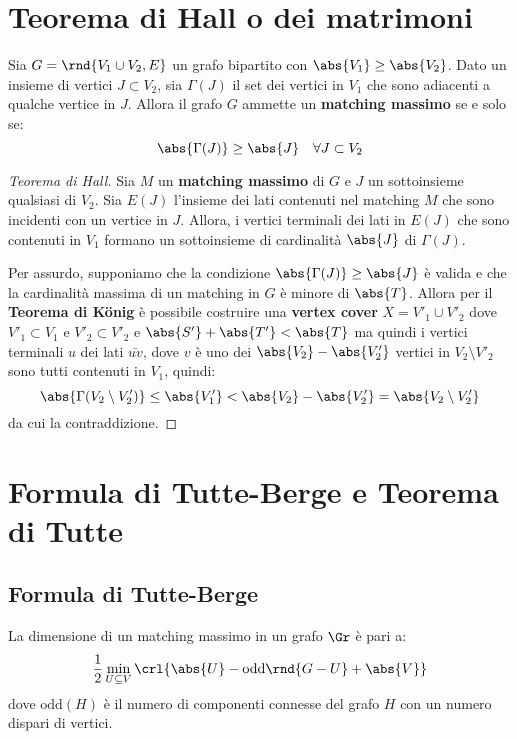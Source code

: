 \documentclass[\main/main.tex]{subfiles}
\begin{document}
\section{Teorema di Hall o dei matrimoni}
\begin{theorem}
  Sia \(G = \rnd{V_1 \cup V_2, E}\) un grafo bipartito con \(\abs{V_1} \geq \abs{V_2}\). Dato un insieme di vertici \(J \subset V_2\), sia \(\Gamma(J) \) il set dei vertici in \(V_1\) che sono adiacenti a qualche vertice in \(J\). Allora il grafo \(G\) ammette un \textbf{matching massimo} se e solo se:
  \[
    \abs{\Gamma(J)} \geq \abs{J} \quad \forall J \subset V_2
  \]
\end{theorem}

\begin{proof}[Teorema di Hall]
  Sia \(M\) un \textbf{matching massimo} di \(G\) e \(J\) un sottoinsieme qualsiasi di \(V_2\). Sia \(E(J)\) l'insieme dei lati contenuti nel matching \(M\) che sono incidenti con un vertice in \(J\). Allora, i vertici terminali dei lati in \(E(J)\) che sono contenuti in \(V_1\) formano un sottoinsieme di cardinalità \(\abs{J}\) di \(\Gamma(J)\).

  Per assurdo, supponiamo che la condizione \(\abs{\Gamma(J)} \geq \abs{J}\) è valida e che la cardinalità massima di un matching in \(G\) è minore di \(\abs{T}\). Allora per il \textbf{Teorema di König} è possibile costruire una \textbf{vertex cover} \(X=V'_1 \cup V'_2\) dove \(V'_1 \subset V_1\) e \(V'_2 \subset V'_2\) e \(\abs{S'} + \abs{T'} < \abs{T}\) ma quindi i vertici terminali \(u\) dei lati \(\bar{uv}\), dove \(v\) è uno dei \(\abs{V_2} - \abs{V'_2}\) vertici in \(V_2\setminus V'_2\) sono tutti contenuti in \(V_1\), quindi:
  \[
    \abs{\Gamma(V_2\setminus V'_2)} \leq \abs{V'_1} < \abs{V_2} - \abs{V'_2} = \abs{V_2\setminus V'_2}
  \]
  da cui la contraddizione.
\end{proof}

\section{Formula di Tutte-Berge e Teorema di Tutte}
\subsection{Formula di Tutte-Berge}
\begin{theorem}
  La dimensione di un matching massimo in un grafo \(\Gr \) è pari a:
  \[
    \frac{1}{2} \min_{U \subseteq V} \crl{\abs{U} - \text{odd}\rnd{G-U} + \abs{V}}
  \]
  dove \(\text{odd}(H)\) è il numero di componenti connesse del grafo \(H\) con un numero dispari di vertici.
\end{theorem}
\end{document}

